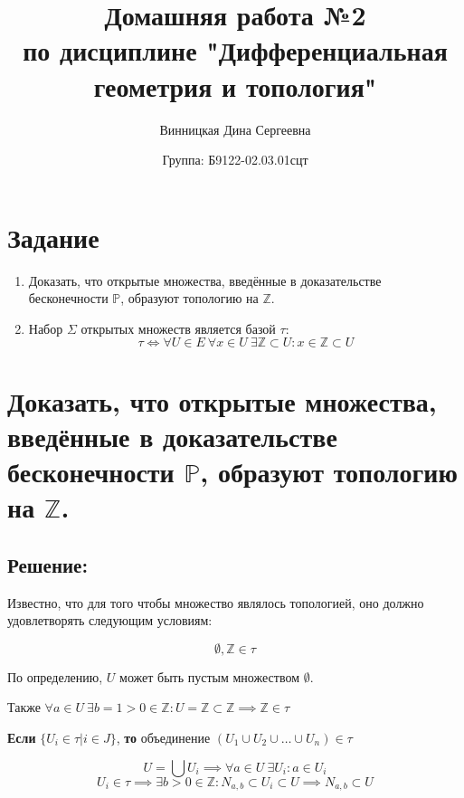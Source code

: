 \documentclass{article}
\title{\vspace{-1cm}Домашняя работа №2 \\ по дисциплине "Дифференциальная геометрия и топология"}
\author{Винницкая Дина Сергеевна}
\date{Группа: Б9122-02.03.01сцт}
\begin{document}
	
	\maketitle

        \section{Задание} 

       \begin{enumerate}
            \item Доказать, что открытые множества, введённые в доказательстве бесконечности $\mathbb{P}$, образуют топологию на $\mathbb{Z}$.
            
            \item Набор $\Sigma$ открытых множеств является базой  $\tau$:
            \[
            \tau \iff \forall U \in E \ \forall x \in U \ \exists \mathbb{Z}  \subset U : x \in \mathbb{Z}  \subset U
            \]
        \end{enumerate}


        \section{Доказать, что открытые множества, введённые в доказательстве бесконечности $\mathbb{P}$, образуют топологию на $\mathbb{Z}$.} 
        
        \subsection{Решение:}

        Известно, что для того чтобы множество являлось топологией, оно должно удовлетворять следующим условиям:
        
        \[
        \emptyset, \mathbb{Z}  \in \tau
        \]
        
        По определению, $U$ может быть пустым множеством $\emptyset$.
        
        Также $\forall a \in U \ \exists b = 1 > 0 \in \mathbb{Z} : U = \mathbb{Z}  \subset \mathbb{Z}  \implies \mathbb{Z}  \in \tau$
        
        \textbf{Если} $\{U_i \in \tau | i \in J\}$, \textbf{то} объединение $\left( U_1 \cup U_2 \cup \dots \cup U_n \right) \in \tau$
        
        \[
        U = \bigcup U_i \implies \forall a \in U \ \exists  U_i : a \in U_i
        \]
        \[
        U_i \in \tau \implies \exists b > 0 \in \mathbb{Z}  : N_{a,b} \subset U_i \subset U \implies N_{a,b} \subset U
        \]
        
\end{document}
